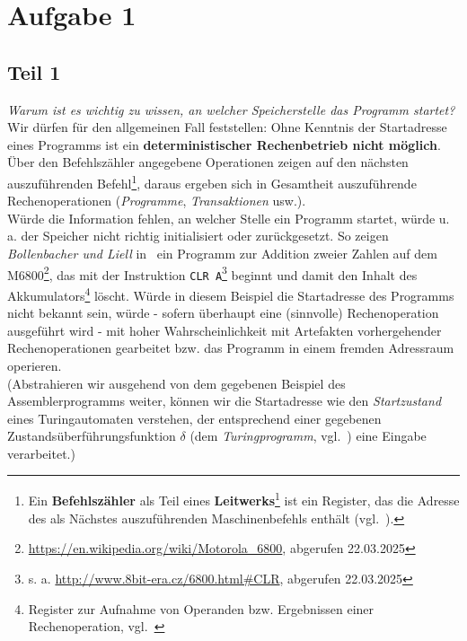 \chapter{Aufgabe 1}

\section{Teil 1}

\textit{Warum ist es wichtig zu wissen, an welcher Speicherstelle das Programm startet?}\\

\noindent
Wir dürfen für den allgemeinen Fall feststellen: Ohne Kenntnis der Startadresse eines Programms ist ein \textbf{deterministischer Rechenbetrieb nicht möglich}.\\

\noindent
Über den Befehlszähler angegebene Operationen zeigen auf den nächsten auszuführenden Befehl\footnote{
    Ein \textbf{Befehlszähler} als Teil eines \textbf{Leitwerks}\footnote{
        hier insbesondere bei der Von-Neumann-Rechnerarchitektur
    } ist ein Register, das die Adresse des als Nächstes auszuführenden Maschinenbefehls enthält (vgl.~\cite[234]{Fri21}).
}, daraus ergeben sich in Gesamtheit auszuführende Rechenoperationen (\textit{Programme}, \textit{Transaktionen} usw.).\\
Würde die Information fehlen, an welcher Stelle ein Programm startet, würde u.\,a. der Speicher nicht richtig initialisiert oder zurückgesetzt.
So zeigen \textit{Bollenbacher und Liell} in~\cite[\textbf{Tabelle 19}, 86]{ES1} ein Programm zur Addition zweier Zahlen auf dem M6800\footnote{
    \url{https://en.wikipedia.org/wiki/Motorola_6800}, abgerufen 22.03.2025
}, das mit der Instruktion \texttt{CLR A}\footnote{
    s. a. \url{http://www.8bit-era.cz/6800.html#CLR}, abgerufen 22.03.2025
} beginnt und damit den Inhalt des Akkumulators\footnote{
    Register zur Aufnahme von Operanden bzw. Ergebnissen einer Rechenoperation, vgl.~\cite[233]{Fri21}
} löscht.
Würde in diesem Beispiel die Startadresse des Programms nicht bekannt sein, würde - sofern überhaupt eine (sinnvolle) Rechenoperation ausgeführt wird - mit hoher Wahrscheinlichkeit mit Artefakten vorhergehender Rechenoperationen gearbeitet bzw. das Programm in einem fremden Adressraum operieren.\\

\noindent
(Abstrahieren wir ausgehend von dem gegebenen Beispiel des Assemblerprogramms weiter, können wir die Startadresse wie den \textit{Startzustand} eines Turingautomaten verstehen, der entsprechend einer gegebenen Zustandsüberführungsfunktion $\delta$ (dem \textit{Turingprogramm}, vgl.~\cite[269 f.]{VW16h}) eine Eingabe verarbeitet.)

